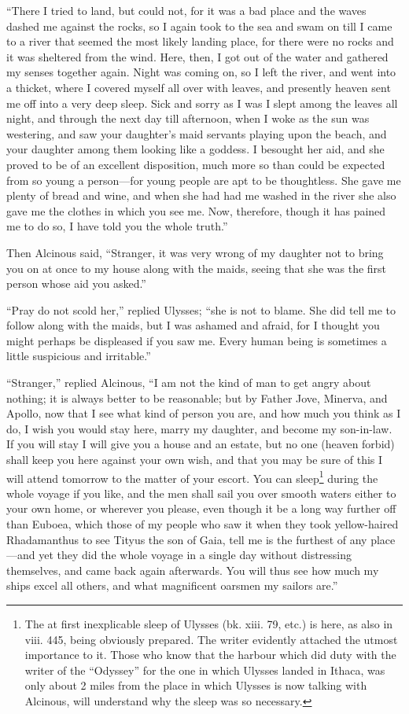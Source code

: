 “There I tried to land, but could not, for it was a bad place and the waves
dashed me against the rocks, so I again took to the sea and swam on till I came
to a river that seemed the most likely landing place, for there were no rocks
and it was sheltered from the wind. Here, then, I got out of the water and
gathered my senses together again. Night was coming on, so I left the river,
and went into a thicket, where I covered myself all over with leaves, and
presently heaven sent me off into a very deep sleep. Sick and sorry as I was I
slept among the leaves all night, and through the next day till afternoon, when
I woke as the sun was westering, and saw your daughter’s maid servants playing
upon the beach, and your daughter among them looking like a goddess. I besought
her aid, and she proved to be of an excellent disposition, much more so than
could be expected from so young a person—for young people are apt to be
thoughtless. She gave me plenty of bread and wine, and when she had had me
washed in the river she also gave me the clothes in which you see me. Now,
therefore, though it has pained me to do so, I have told you the whole truth.”

Then Alcinous said, “Stranger, it was very wrong of my daughter not to bring
you on at once to my house along with the maids, seeing that she was the first
person whose aid you asked.”

“Pray do not scold her,” replied Ulysses; “she is not to blame. She did tell me
to follow along with the maids, but I was ashamed and afraid, for I thought you
might perhaps be displeased if you saw me. Every human being is sometimes a
little suspicious and irritable.”

“Stranger,” replied Alcinous, “I am not the kind of man to get angry about
nothing; it is always better to be reasonable; but by Father Jove, Minerva, and
Apollo, now that I see what kind of person you are, and how much you think as I
do, I wish you would stay here, marry my daughter, and become my son-in-law. If
you will stay I will give you a house and an estate, but no one (heaven forbid)
shall keep you here against your own wish, and that you may be sure of this I
will attend tomorrow to the matter of your escort. You can sleep\footnote{The at first inexplicable sleep of Ulysses (bk. xiii. 79, etc.) is here, as
also in viii. 445, being obviously prepared. The writer evidently attached the
utmost importance to it. Those who know that the harbour which did duty with
the writer of the “Odyssey” for the one in which Ulysses landed in Ithaca, was
only about 2 miles from the place in which Ulysses is now talking with
Alcinous, will understand why the sleep was so necessary.} during the whole
voyage if you like, and the men shall sail you over smooth waters either to
your own home, or wherever you please, even though it be a long way further off
than Euboea, which those of my people who saw it when they took yellow-haired
Rhadamanthus to see Tityus the son of Gaia, tell me is the furthest of any
place—and yet they did the whole voyage in a single day without distressing
themselves, and came back again afterwards. You will thus see how much my ships
excel all others, and what magnificent oarsmen my sailors are.”


